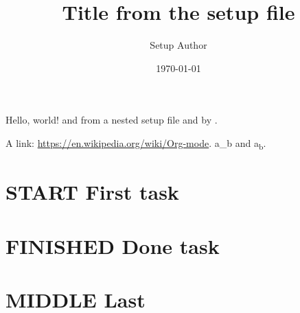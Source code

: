 \documentclass[11pt]{article}
\author{Setup Author}
\date{\today}
\title{Title from the setup file}
\begin{document}
\maketitle
Hello, world! and from a nested setup file and  by .

A link: \url{https://en.wikipedia.org/wiki/Org-mode}. a\_b and a\textsubscript{b}.
\section{{\bfseries\sffamily START} First task}
\label{sec:org5f46c53}
\section{{\bfseries\sffamily FINISHED} Done task}
\label{sec:org6c7538d}
\section{{\bfseries\sffamily MIDDLE} Last}
\label{sec:orgb5ff499}
\end{document}
